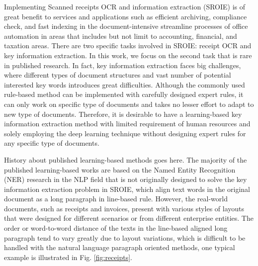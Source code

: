 \documentclass[10pt,twocolumn,letterpaper]{article}
\begin{document}
Implementing Scanned receipts OCR and information extraction (SROIE) is of great benefit to services and applications such as efficient archiving, compliance check, and fast indexing in the document-intensive streamline processes of office automation in areas that includes but not limit to accounting, financial, and taxation areas. There are two specific tasks involved in SROIE: receipt OCR and key information extraction. In this work, we focus on the second task that is rare in published research. In fact, key information extraction faces big challenges, where different types of document structures and vast number of potential interested key words introduces great difficulties. Although the commonly used rule-based method can be implemented with carefully designed expert rules, it can only work on specific type of documents and takes no lesser effort to adapt to new type of documents. Therefore, it is desirable to have a learning-based key information extraction method with limited requirement of human resources and solely employing the deep learning technique without designing expert rules for any specific type of documents. 

History about published learning-based methods goes here.
The majority of the published learning-based works are based on the Named Entity Recognition (NER) research in the NLP field that is not originally designed to solve the key information extraction problem in SROIE, which align text words in the original document as a long paragraph in line-based rule. However, the real-world documents, such as receipts and invoices, present with various styles of layouts that were designed for different scenarios or from different enterprise entities. The order or word-to-word distance of the texts in the line-based aligned long paragraph tend to vary greatly due to layout variations, which is difficult to be handled with the natural language paragraph oriented methods, one typical example is illustrated in Fig. \ref{fig:receipts}.
\end{document}
